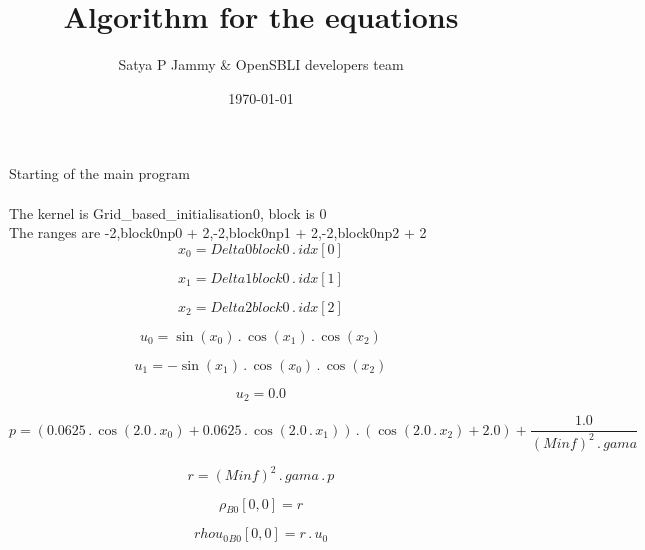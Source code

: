 \documentclass{article}
\title{Algorithm for the equations}
\author{Satya P Jammy \& OpenSBLI developers team}
\date{\today}
\begin{document}
\maketitle
\noindent Starting of the main program\\
\\\noindent The kernel is Grid_based_initialisation0, block is 0\\\noindent The ranges are -2,block0np0 + 2,-2,block0np1 + 2,-2,block0np2 + 2\\\begin{dmath}x_{0} = Delta0block0 \,.\, {idx}[{0}]\end{dmath}

\begin{dmath}x_{1} = Delta1block0 \,.\, {idx}[{1}]\end{dmath}

\begin{dmath}x_{2} = Delta2block0 \,.\, {idx}[{2}]\end{dmath}

\begin{dmath}u_{0} = \sin{\left (x_{0} \right )} \,.\, \cos{\left (x_{1} \right )} \,.\, \cos{\left (x_{2} \right )}\end{dmath}

\begin{dmath}u_{1} = - \sin{\left (x_{1} \right )} \,.\, \cos{\left (x_{0} \right )} \,.\, \cos{\left (x_{2} \right )}\end{dmath}

\begin{dmath}u_{2} = 0.0\end{dmath}

\begin{dmath}p = \left(0.0625 \,.\, \cos{\left (2.0 \,.\, x_{0} \right )} + 0.0625 \,.\, \cos{\left (2.0 \,.\, x_{1} \right )}\right) \,.\, \left(\cos{\left (2.0 \,.\, x_{2} \right )} + 2.0\right) + \frac{1.0}{\left(Minf \right)^{2} \,.\, 
gama}\end{dmath}

\begin{dmath}r = \left(Minf \right)^{2} \,.\, gama \,.\, p\end{dmath}

\begin{dmath}{\rho{_{B0}}}[{0,0}] = r\end{dmath}

\begin{dmath}{rhou_{0}{_{B0}}}[{0,0}] = r \,.\, u_{0}\end{dmath}
\end{document}
